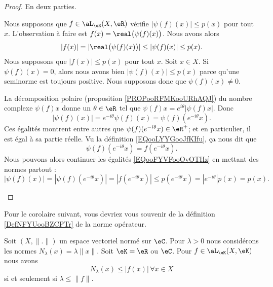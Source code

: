 \begin{proof}
	En deux parties.
	\begin{subproof}
		\spitem[\( \Rightarrow\)]
		Nous supposons que \( f\in \aL_{\eR}(X,\eR)\) vérifie \( | \psi(f)(x) |\leq p(x)\) pour tout \( x\). L'observation à faire est \( f(x)=\real\big( \psi(f)(x) \big)\). Nous avons alors
		\begin{equation}
			| f(x) |=| \real\big( \psi(f)(x) \big) |\leq | \psi(f)(x) |\leq p(x).
		\end{equation}
		\spitem[\( \Leftarrow\)]
		Nous supposons que \( | f(x) |\leq p(x)\) pour tout \( x\). Soit \( x\in X\). Si \( \psi(f)(x)=0\), alors nous avons bien \( | \psi(f)(x) |\leq p(x)\) parce qu'une seminorme est toujours positive. Nous supposons donc que \( \psi(f)(x)\neq 0\).

		La décomposition polaire (proposition \ref{PROPooRFMKooURhAQJ}) du nombre complexe \( \psi(f)x\) donne un \( \theta\in \eR\) tel que \( \psi(f)x= e^{i\theta}| \psi(f)x |\). Donc
		\begin{equation}        \label{EQooFYVFooOvOTHz}
			| \psi(f)(x) |= e^{-i\theta}\psi(f)(x)=\psi(f)( e^{-i\theta}x).
		\end{equation}
		Ces égalités montrent entre autres que \( \psi(f)( e^{-i\theta}x)\in \eR^+\); et en particulier, il est égal à sa partie réelle. Vu la définition \eqref{EQooLYYGooJfKIfu}, ça nous dit que
		\begin{equation}
			\psi(f)( e^{-i\theta}x)=f( e^{-i\theta}x).
		\end{equation}
		Nous pouvons alors continuer les égalités \eqref{EQooFYVFooOvOTHz} en mettant des normes partout :
		\begin{equation}
			| \psi(f)(x) |=| \psi(f)( e^{-i\theta}x) |=| f( e^{-i\theta}x) |\leq p( e^{-i\theta}x)=|  e^{-i\theta} |p(x)=p(x).
		\end{equation}
	\end{subproof}
\end{proof}

Pour le corolaire suivant, vous devriez vous souvenir de la définition \ref{DefNFYUooBZCPTr} de la norme opérateur.

\begin{corollary}        \label{CORooZEKAooENCDNJ}
	Soit \( (X,\| . \|)\) un espace vectoriel normé sur \( \eC\). Pour \( \lambda>0\) nous considérons les normes \( N_{\lambda}(x)=\lambda\| x \|\). Soit \( \eK=\eR\) ou \( \eC\). Pour \( f\in\aL_{\eK}(X,\eK)\) nous avons
	\begin{equation}
		N_{\lambda}(x)\leq | f(x) |\,\forall x\in X
	\end{equation}
	si et seulement si \( \lambda\leq \| f \|\).
\end{corollary}

